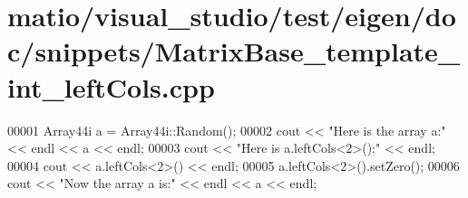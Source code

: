 \hypertarget{matio_2visual__studio_2test_2eigen_2doc_2snippets_2_matrix_base__template__int__left_cols_8cpp_source}{}\section{matio/visual\+\_\+studio/test/eigen/doc/snippets/\+Matrix\+Base\+\_\+template\+\_\+int\+\_\+left\+Cols.cpp}
\label{matio_2visual__studio_2test_2eigen_2doc_2snippets_2_matrix_base__template__int__left_cols_8cpp_source}

\begin{DoxyCode}
00001 Array44i a = Array44i::Random();
00002 cout << \textcolor{stringliteral}{"Here is the array a:"} << endl << a << endl;
00003 cout << \textcolor{stringliteral}{"Here is a.leftCols<2>():"} << endl;
00004 cout << a.leftCols<2>() << endl;
00005 a.leftCols<2>().setZero();
00006 cout << \textcolor{stringliteral}{"Now the array a is:"} << endl << a << endl;
\end{DoxyCode}
